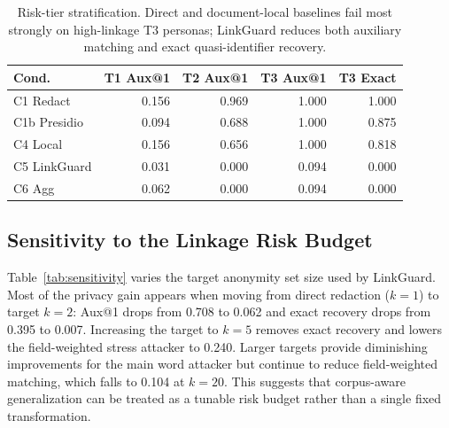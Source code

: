 \documentclass{article}
\newcommand{\method}{LinkGuard}
\begin{document}
\begin{table}[t]
\centering
\small
\setlength{\tabcolsep}{5pt}
\begin{tabular}{lrrrr}
\toprule
Cond. & T1 Aux@1 & T2 Aux@1 & T3 Aux@1 & T3 Exact \\
\midrule
C1 Redact & 0.156 & 0.969 & 1.000 & 1.000 \\
C1b Presidio & 0.094 & 0.688 & 1.000 & 0.875 \\
C4 Local & 0.156 & 0.656 & 1.000 & 0.818 \\
C5 \method{} & 0.031 & 0.000 & 0.094 & 0.000 \\
C6 Agg & 0.062 & 0.000 & 0.094 & 0.000 \\
\bottomrule
\end{tabular}
\caption{Risk-tier stratification. Direct and document-local baselines fail most strongly on high-linkage T3 personas; \method{} reduces both auxiliary matching and exact quasi-identifier recovery.}
\label{tab:tier}
\end{table}

\subsection{Sensitivity to the Linkage Risk Budget}

Table~\ref{tab:sensitivity} varies the target anonymity set size used by \method{}.
Most of the privacy gain appears when moving from direct redaction ($k=1$) to target $k=2$: Aux@1 drops from 0.708 to 0.062 and exact recovery drops from 0.395 to 0.007.
Increasing the target to $k=5$ removes exact recovery and lowers the field-weighted stress attacker to 0.240.
Larger targets provide diminishing improvements for the main word attacker but continue to reduce field-weighted matching, which falls to 0.104 at $k=20$.
This suggests that corpus-aware generalization can be treated as a tunable risk budget rather than a single fixed transformation.
\end{document}
